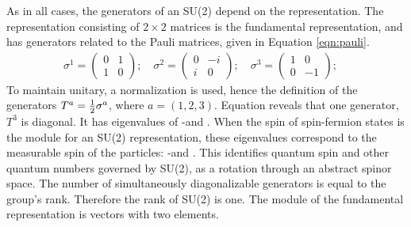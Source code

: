As in all cases, the generators of an SU(2) depend on the representation.
The representation consisting of $2\times2$ matrices is the fundamental representation, and has generators related to the Pauli matrices, given in Equation \ref{eqn:pauli}.
\begin{equation} \begin{split}\label{eqn:pauli}
    \sigma^1=\begin{pmatrix}0&1\\1&0\end{pmatrix} ;\quad
    \sigma^2=\begin{pmatrix}0&-i\\i&0\end{pmatrix} ;\quad
    \sigma^3=\begin{pmatrix}1&0\\0&-1\end{pmatrix} ;\quad
\end{split} \end{equation}
To maintain unitary, a normalization is used, hence the definition of the generators $T^a=\frac{1}{2}\sigma^a$, where $a=(1,2,3)$.
Equation \label{eqn:pauli} reveals that one generator, $T^3$ is diagonal.
It has eigenvalues of -\half and \half.
When the spin of spin-\half fermion states is the module for an SU(2) representation, these eigenvalues correspond to the measurable spin of the particles: -\half and \half.
This identifies quantum spin and other quantum numbers governed by SU(2), as a rotation through an abstract spinor space.
The number of simultaneously diagonalizable generators is equal to the group's rank. Therefore the rank of SU(2) is one.
The module of the fundamental representation is vectors with two elements.

